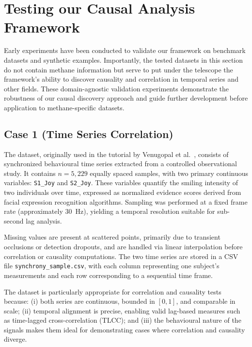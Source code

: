 
\section{Testing our Causal Analysis Framework}

Early experiments have been conducted to validate our framework on benchmark datasets and synthetic examples. Importantly, the tested datasets in this section do not contain methane information but serve to put under the telescope the framework's ability to discover causality and correlation in temporal series and other fields. These domain-agnostic validation experiments demonstrate the robustness of our causal discovery approach and guide further development before application to methane-specific datasets.

\subsection{Case 1 (Time Series Correlation)}
The dataset, originally used in the tutorial by Venugopal et al.~\cite{Venugopal2023}, consists of synchronized behavioural time series extracted from a controlled observational study. It contains $n = 5,229$ equally spaced samples, with two primary continuous variables: \texttt{S1\_Joy} and \texttt{S2\_Joy}. These variables quantify the smiling intensity of two individuals over time, expressed as normalized evidence scores derived from facial expression recognition algorithms. Sampling was performed at a fixed frame rate (approximately 30~Hz), yielding a temporal resolution suitable for sub-second lag analysis.

Missing values are present at scattered points, primarily due to transient occlusions or detection dropouts, and are handled via linear interpolation before correlation or causality computations. The two time series are stored in a CSV file \texttt{synchrony\_sample.csv}, with each column representing one subject’s measurements and each row corresponding to a sequential time frame.

The dataset is particularly appropriate for correlation and causality tests because:
(i) both series are continuous, bounded in $[0,1]$, and comparable in scale;
(ii) temporal alignment is precise, enabling valid lag-based measures such as time-lagged cross-correlation (TLCC); and
(iii) the behavioural nature of the signals makes them ideal for demonstrating cases where correlation and causality diverge.

